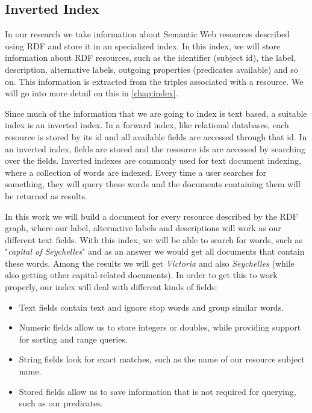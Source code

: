 \subsection{Inverted Index}
\label{chap:lucene}

In our research we take information about Semantic Web resources described using RDF and store it in an specialized index. In this index, we will store information about RDF resources, such as the identifier (subject id), the label, description, alternative labels, outgoing properties (predicates available) and so on. This information is extracted from the triples associated with a resource. We will go into more detail on this in \autoref{chap:index}.

Since much of the information that we are going to index is text based, a suitable index is an inverted index. In a forward index, like relational databases, each resource is stored by its id and all available fields are accessed through that id. In an inverted index, fields are stored and the resource ids are accessed by searching over the fields. Inverted indexes are commonly used for text document indexing, where a collection of words are indexed. Every time a user searches for something, they will query these words and the documents containing them will be returned as results.

In this work we will build a document for every resource described by the RDF graph, where our label, alternative labels and descriptions will work as our different text fields. With this index, we will be able to search for words, such as "\textit{capital of Seychelles}" and as an answer we would get all documents that contain these words. Among the results we will get \textit{Victoria} and also \textit{Seychelles} (while also getting other capital-related documents). In order to get this to work properly, our index will deal with different kinds of fields:

\begin{itemize}
    \item Text fields contain text and ignore stop words and group similar words.
    \item Numeric fields allow us to store integers or doubles, while providing support for sorting and range queries.
    \item String fields look for exact matches, such as the name of our resource subject name.
    \item Stored fields allow us to save information that is not required for querying, such as our predicates.
\end{itemize}

